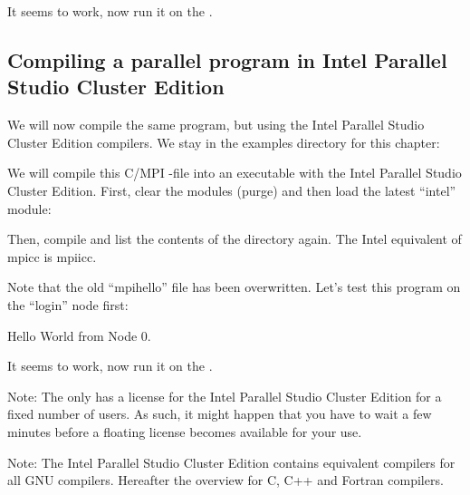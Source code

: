 It seems to work, now run it on the \hpc.

\begin{prompt}
\end{prompt}

\subsection{Compiling a parallel program in Intel Parallel Studio Cluster Edition}

We will now compile the same program, but using the Intel Parallel Studio
Cluster Edition compilers. We stay in the examples directory for this chapter:

\begin{prompt}
\end{prompt}

We will compile this C/MPI -file into an executable with the Intel Parallel Studio
Cluster Edition. First, clear the modules (purge) and then load the latest
``intel'' module:

\begin{prompt}
\end{prompt}

Then, compile and list the contents of the directory again. The Intel
equivalent of mpicc is mpiicc.

\begin{prompt}
\end{prompt}

Note that the old ``mpihello'' file has been overwritten.
Let's test this program on the ``login'' node first:

\begin{prompt}
Hello World from Node 0.
\end{prompt}

It seems to work, now run it on the \hpc.

\begin{prompt}
\end{prompt}

Note: The \association only has a license for the Intel Parallel Studio Cluster Edition for a
fixed number of users. As such, it might happen that you have to wait a few
minutes before a floating license becomes available for your use.

Note: The Intel Parallel Studio Cluster Edition contains equivalent compilers for all GNU
compilers. Hereafter the overview for C, C++ and Fortran compilers.

